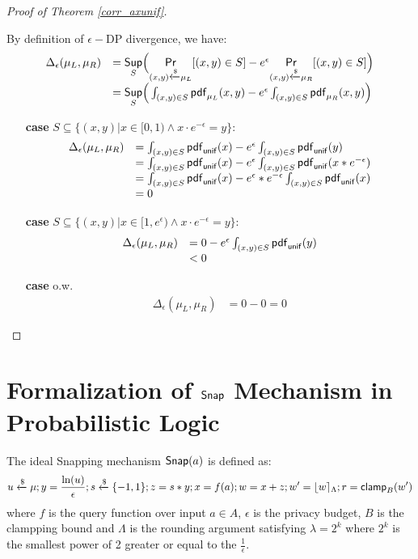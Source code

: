 \documentclass[a4paper,11pt]{article}
\begin{document}
\begin{proof}[Proof of Theorem \ref{corr_axunif}]
\begin{itemize}
	By definition of $\epsilon-$DP divergence, we have:
	 \[
	 \begin{array}{ll}
	 \Delta_{\epsilon}(\mu_L, \mu_R) 
	 & = \underset{S}{\mathsf{Sup}}
	 \Big(
	 \underset{(x,y) \xleftarrow{\$} \mu_L}{\mathsf{Pr}}[(x,y) \in S] - e^{\epsilon} \underset{(x,y) \xleftarrow{\$} \mu_R}{\mathsf{Pr}}[(x,y) \in S]
	 \Big) \\
	 & =\underset{S}{\mathsf{Sup}}
	 \Big(
	 \int_{(x,y) \in S} \mathsf{pdf}_{\mu_L}(x, y) - e^{\epsilon} \int_{(x,y) \in S} \mathsf{pdf}_{\mu_R}(x, y)
	 \Big)	 
	 \end{array}
	 \]
	 \begin{itemize}
	 	\item[{\bf case}] $S \subseteq \{(x, y) | x \in [0, 1) \land x \cdot e^{-\epsilon} = y\}$:\\
		 \[
		 \begin{array}{ll}
		 \Delta_{\epsilon}(\mu_L, \mu_R) 
		 & = 
		 \int_{(x,y) \in S} \mathsf{pdf}_{\mathsf{unif}}(x) - e^{\epsilon} \int_{(x,y) \in S} \mathsf{pdf}_{\mathsf{unif}}(y)\\
		 & = 
		 \int_{(x,y) \in S} \mathsf{pdf}_{\mathsf{unif}}(x) - e^{\epsilon} \int_{(x,y) \in S} \mathsf{pdf}_{\mathsf{unif}}(x * e^{-\epsilon})\\ 
		 & = 
		 \int_{(x,y) \in S} \mathsf{pdf}_{\mathsf{unif}}(x) - e^{\epsilon}* e^{-\epsilon} \int_{(x,y) \in S} \mathsf{pdf}_{\mathsf{unif}}(x )\\
		 & = 0 
		 \end{array}
		 \]
	 	\item[{\bf case}] $S \subseteq \{(x, y) | x \in [1, e^{\epsilon}) \land x \cdot e^{-\epsilon} = y\}$:\\
		 \[
		 \begin{array}{ll}
		 \Delta_{\epsilon}(\mu_L, \mu_R) 
		 & = 
		 0 - e^{\epsilon} \int_{(x,y) \in S} \mathsf{pdf}_{\mathsf{unif}}(y)\\
		 & <  0 
		 \end{array}
		 \]
	 	\item[{\bf case}] o.w.\\
		 \[
		 \begin{array}{ll}
		 \Delta_{\epsilon}(\mu_L, \mu_R) 
		 & = 0 - 0 =  0 
		 \end{array}
		 \]	 	

	 \end{itemize}

\end{itemize}
\end{proof}

\section{Formalization of $\mathsf{Snap}$ Mechanism in Probabilistic Logic}
\begin{defn}
The ideal Snapping mechanism $\mathsf{Snap}( a)$ is defined as:
\[
	u \xleftarrow{\$} \mu; y = \frac{\ln (u)}{\epsilon}; s \xleftarrow{\$} \{-1, 1\}; z = s * y; x = f(a); w = x + z; w' = \lfloor w \rceil_{\Lambda}; r = \mathsf{clamp}_B (w')
\]
where $f$ is the query function over input $a \in A$, $\epsilon$ is the privacy budget, $B$ is the clampping bound and $\Lambda$ is the rounding argument satisfying $\lambda = 2^k$ where $2^k$ is the smallest power of 2 greater or equal to the $\frac{1}{\epsilon}$.
\end{defn}
\end{document}

